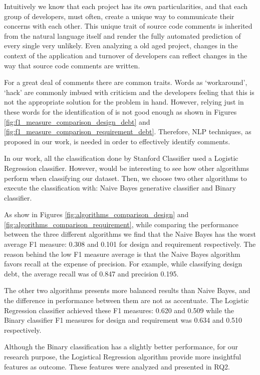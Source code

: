 Intuitively we know that each project has its own particularities, and that each group of developers, must often, create a unique way to communicate their concerns with each other. This unique trait of source code comments is inherited from the natural language itself and render the fully automated prediction of every single \SATD very unlikely. Even analyzing a old aged project, changes in the context of the application and turnover of developers can reflect changes in the way that source code comments are written. 

For a great deal of \SATD comments there are common traits. Words as `workaround', `hack' are commonly imbued with criticism and the developers feeling that this is not the appropriate solution for the problem in hand. However, relying just in these words for the identification of \SATD is not good enough as shown in Figures \ref{fig:f1_measure_comparison_design_debt} and \ref{fig:f1_measure_comparison_requirement_debt}. Therefore, NLP techniques, as proposed in our work, is needed in order to effectively identify \SATD comments.

In our work, all the classification done by Stanford Classifier used a Logistic Regression classifier. However, would be interesting to see how other  algorithms perform when classifying our dataset. Then, we choose two other algorithms to execute the classification with: Naive Bayes generative classifier and Binary classifier.

As show in Figures \ref{fig:algorithms_comparison_design} and \ref{fig:algorithms_comparison_requirement}, while comparing the performance between the three different algorithms we find that the Naive Bayes has the worst average F1 measure: 0.308 and 0.101 for design and requirement \SATD respectively. The reason behind the low F1 measure average is that the Naive Bayes algorithm favors recall at the expense of precision. For example, while classifying design debt, the average recall was of 0.847 and precision 0.195.

The other two algorithms presents more balanced results than Naive Bayes, and the difference in performance between them are not as accentuate. The Logistic Regression classifier achieved these F1 measures: 0.620 and 0.509 while the Binary classifier F1 measures for design and requirement \SATD was 0.634 and 0.510 respectively. 

Although the Binary classification has a slightly better performance, for our research purpose, the Logistical Regression algorithm provide more insightful features as outcome. These features were analyzed and presented in RQ2. 